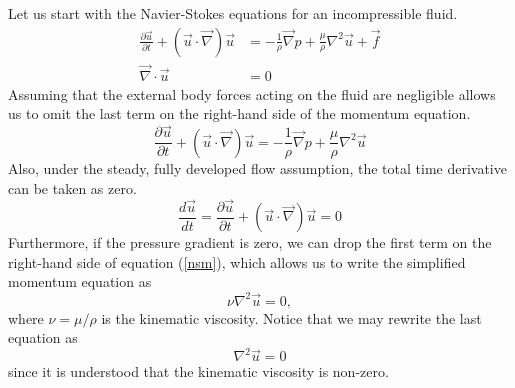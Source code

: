 Let us start with the Navier-Stokes equations for an incompressible fluid.
\begin{align}
    \frac{\partial \vec{u}}{\partial t} + (\vec{u}\cdot\vec{\nabla})\vec{u} &= -\frac{1}{\rho}\vec{\nabla}p + \frac{\mu}{\rho}\nabla^2\vec{u} + \vec{f}\\
    \vec{\nabla}\cdot\vec{u} &= 0
\end{align}
Assuming that the external body forces acting on the fluid are negligible allows us to omit the last term on the right-hand side of the momentum equation.
\begin{equation}
    \frac{\partial \vec{u}}{\partial t} + (\vec{u}\cdot\vec{\nabla})\vec{u} = -\frac{1}{\rho}\vec{\nabla}p + \frac{\mu}{\rho}\nabla^2\vec{u}
    \label{nsm}
\end{equation}
Also, under the steady, fully developed flow assumption, the total time derivative can be taken as zero.
\begin{equation}
    \frac{d\vec{u}}{dt} = \frac{\partial \vec{u}}{\partial t} + (\vec{u}\cdot\vec{\nabla})\vec{u} = 0
\end{equation}
Furthermore, if the pressure gradient is zero, we can drop the first term on the right-hand side of equation (\ref{nsm}), which allows us to write the simplified momentum equation as 
\begin{equation}
    \nu\nabla^2\vec{u} = 0,
\end{equation}
where $\nu = \mu/\rho$ is the kinematic viscosity. Notice that we may rewrite the last equation as 
\begin{equation}
    \nabla^2\vec{u} = 0
\end{equation}
since it is understood that the kinematic viscosity is non-zero. 

